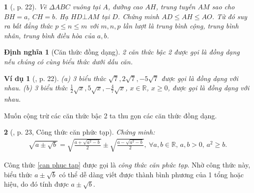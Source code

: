 \documentclass{article}
\newtheorem{baitoan}{}
\newtheorem{dinhnghia}{Định nghĩa}
\newtheorem{vidu}{Ví dụ}
\begin{document}
\begin{baitoan}[\cite{Binh_boi_duong_Toan_9_tap_1}, p. 22]
	Vẽ $\Delta ABC$ vuông tại $A$, đường cao $AH$, trung tuyến $AM$ sao cho $BH = a$, $CH = b$. Hạ $HD\bot AM$ tại $D$. Chứng minh $AD\le AH\le AO$. Từ đó suy ra bất đẳng thức $p\le n\le m$ với $m,n,p$ lần lượt là trung bình cộng, trung bình nhân, trung bình điều hòa của $a,b$.
	\begin{center}
	\end{center}
\end{baitoan}

\begin{dinhnghia}[Căn thức đồng dạng]
	2 căn thức bậc 2 được gọi là {\rm đồng dạng} nếu chúng có cùng biểu thức dưới dấu căn.
\end{dinhnghia}

\begin{vidu}[\cite{Binh_boi_duong_Toan_9_tap_1}, p. 22]
	(a) 3 biểu thức $\sqrt{7},2\sqrt{7},-5\sqrt{7}$ được gọi là {\rm đồng dạng} với nhau. (b) 3 biểu thức $\frac{1}{2}\sqrt{x},5\sqrt{x},-\frac{4}{7}\sqrt{x}$, $x\in\mathbb{R}$, $x\ge0$, được gọi là {\rm đồng dạng} với nhau.
\end{vidu}
Muốn cộng trừ các căn thức bậc 2 ta thu gọn các căn thức đồng dạng.

\begin{baitoan}[\cite{Binh_boi_duong_Toan_9_tap_1}, p. 23, Công thức căn phức tạp]
	Chứng minh:
	\begin{align}
		\label{can phuc tap}
		\sqrt{a\pm\sqrt{b}} = \sqrt{\frac{a + \sqrt{a^2 - b}}{2}}\pm\sqrt{\frac{a - \sqrt{a^2 - b}}{2}},\ \forall a,b\in\mathbb{R},\,a,b > 0,\,a^2\ge b.
	\end{align}
\end{baitoan}
Công thức \eqref{can phuc tap} được gọi là \textit{công thức căn phức tạp}. Nhờ công thức này, biểu thức $a\pm\sqrt{b}$ có thể dễ dàng viết được thành bình phương của 1 tổng hoặc hiệu, do đó tính được $a\pm\sqrt{b}$.
\end{document}
